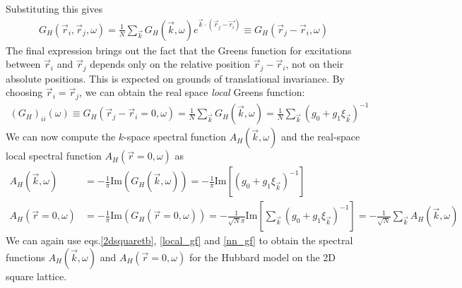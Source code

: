 \documentclass[12pt]{article}
\numberwithin{equation}{section}
\begin{document}
Substituting this gives
\begin{equation}\begin{aligned}
	G_H(\vec r_i, \vec  r_j, \omega) = \frac{1}{N}\sum_{\vec k} G_H(\vec k, \omega)  e^{\vec{k}\cdot\left(\vec r_j - \vec{r_i}\right)} \equiv G_H(\vec r_j - \vec  r_i, \omega)
\end{aligned}\end{equation}
The final expression brings out the fact that the Greens function for excitations between \(\vec r_i\) and \(\vec r_j\) depends only on the relative position \(\vec r_j - \vec r_i\), not on their absolute positions. This is expected on grounds of translational invariance. By choosing \(\vec r_i = \vec r_j\), we can obtain the real space \textit{local} Greens function:
\begin{equation}\begin{aligned}
	\left(G_H\right)_{ii}(\omega) \equiv G_H(\vec r_j - \vec  r_i = 0, \omega) = \frac{1}{N}\sum_{\vec k} G_H(\vec k, \omega) = \frac{1}{N}\sum_{\vec k}\left(g_0 + g_1 \xi_{\vec k}\right)^{-1}
\end{aligned}\end{equation}
We can now compute the $k$-space spectral function $A_{H}(\vec{k},\omega)$ and the real-space local spectral function $A_{H}(\vec{r}=0,\omega)$ as
\begin{equation}\begin{aligned}
A_{H}(\vec{k},\omega) &= -\frac{1}{\pi} \textrm{Im}(G_{H}(\vec{k},\omega)) = -\frac{1}{\pi} \textrm{Im}\left[ (g_{0} + g_{1}\xi_{\vec{k}})^{-1}\right]\\
A_{H}(\vec{r}=0,\omega) &= -\frac{1}{\pi} \textrm{Im}(G_{H}(\vec{r}=0,\omega)) = -\frac{1}{\sqrt N\pi} \textrm{Im}\left[\sum_{\vec{k}} (g_{0} + g_{1}\xi_{\vec{k}})^{-1}\right] = -\frac{1}{\sqrt N}\sum_{\vec{k}}A_{H}(\vec{k},\omega)
\end{aligned}\end{equation}
We can again use eqs.\eqref{2dsquaretb}, \eqref{local_gf} and \eqref{nn_gf} to obtain the spectral functions  $A_{H} (\vec{k},\omega)$ and $A_{H} (\vec{r}=0,\omega)$ for the Hubbard model on the 2D square lattice.
\end{document}
